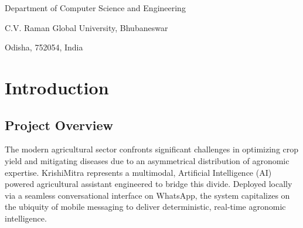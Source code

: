 \documentclass[12pt, a4paper]{report}
\begin{document}
\begin{titlepage}
    \vspace{1cm}
    
    {\large Department of Computer Science and Engineering\par}
    {\large C.V. Raman Global University, Bhubaneswar\par}
    {\large Odisha, 752054, India\par}
    
    \vspace*{1cm}
\end{titlepage}

\singlespacing

\tableofcontents
\newpage

\onehalfspacing

\chapter{Introduction}

\section{Project Overview}
The modern agricultural sector confronts significant challenges in optimizing crop yield and mitigating diseases due to an asymmetrical distribution of agronomic expertise. KrishiMitra represents a multimodal, Artificial Intelligence (AI) powered agricultural assistant engineered to bridge this divide. Deployed locally via a seamless conversational interface on WhatsApp, the system capitalizes on the ubiquity of mobile messaging to deliver deterministic, real-time agronomic intelligence. 
\end{document}
